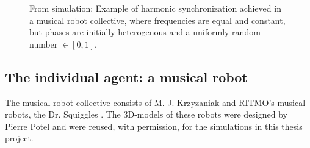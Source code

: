 \begin{figure}[ht!]
\begin{subfigure}[t]{.5\textwidth}
			\end{subfigure}
		\caption{From simulation: Example of harmonic synchronization achieved in a musical robot collective, where frequencies are equal and constant, but phases are initially heterogenous and a uniformly random number $\in [0,1]$.} %
		\label{fig:first_idea:second_fig}
	\end{figure}






	
	\subsection{The individual agent: a musical robot}
	\label{subsec:agent}
		The musical robot collective consists of M. J. Krzyzaniak and RITMO's musical robots, the Dr. Squiggles \cite{dr_squiggles}. The 3D-models of these robots were designed by Pierre Potel \cite{pierre_potel} and were reused, with permission, for the simulations in this thesis project.
		
